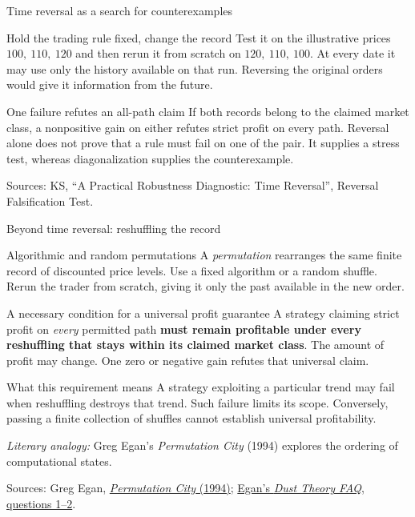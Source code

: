\documentclass{beamer}
\newcommand{\sourcefoot}[1]{%
  \par\vfill{\fontsize{6.3}{7.5}\selectfont\color{black!65}Sources: #1\par}}
\begin{document}
\begin{frame}{Time reversal as a search for counterexamples}
\small
\begin{block}{Hold the trading rule fixed, change the record}
Test it on the illustrative prices $100,\ 110,\ 120$ and then rerun it
from scratch on $120,\ 110,\ 100$.
At every date it may use only the history available on that run.
Reversing the original orders would give it information from the future.
\end{block}
\begin{alertblock}{One failure refutes an all-path claim}
If both records belong to the claimed market class, a nonpositive gain on
either refutes strict profit on every path.
Reversal alone does not prove that a rule must fail on one of the pair.
It supplies a stress test, whereas diagonalization supplies the counterexample.
\end{alertblock}
\sourcefoot{KS, \enquote{A Practical Robustness Diagnostic: Time Reversal},
Reversal Falsification Test.}
\end{frame}

\begin{frame}[shrink=8]{Beyond time reversal: reshuffling the record}
\small
\begin{block}{Algorithmic and random permutations}
A \emph{permutation} rearranges the same finite record of discounted price
levels. Use a fixed algorithm or a random shuffle. Rerun the trader from
scratch, giving it only the past available in the new order.
\end{block}
\begin{alertblock}{A necessary condition for a universal profit guarantee}
A strategy claiming strict profit on \emph{every} permitted path
\textbf{must remain profitable under every reshuffling that stays within
its claimed market class}. The amount of profit may change.
One zero or negative gain refutes that universal claim.
\end{alertblock}
\begin{exampleblock}{What this requirement means}
A strategy exploiting a particular trend may fail when reshuffling destroys
that trend. Such failure limits its scope. Conversely, passing a finite
collection of shuffles cannot establish universal profitability.
\end{exampleblock}
\medskip
\emph{Literary analogy:} Greg Egan's \emph{Permutation City} (1994)
explores the ordering of computational states.
\sourcefoot{Greg Egan, \href{https://www.gregegan.net/PERMUTATION/Permutation.html}{\emph{Permutation City} (1994)};
\href{https://www.gregegan.net/PERMUTATION/FAQ/FAQ.html}{Egan's \emph{Dust Theory FAQ}, questions 1--2}.}
\end{frame}
\end{document}

